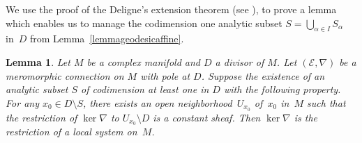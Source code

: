 \documentclass[10pt,a4paper]{amsart}
\numberwithin{equation}{section}
\newtheorem{Lemma}[Theorem]{Lemma}
\begin{document}
We use the proof of the Deligne's extension theorem (see \cite[Chapter~II, Theorems~5.2 and~5.4]{Deligne}), to prove a lemma which enables us to manage the codimension one analytic subset $S=\bigcup_{\alpha\in I} S_\alpha$ in~$D$ from Lemma~\ref{lemmageodesicaffine}.

\begin{Lemma}\label{lemmalocalmonodromy} Let $M$ be a complex manifold and $D$ a divisor of $M$. Let $(\mathcal{E},\nabla)$ be a meromorphic connection on $M$ with pole at $D$.
Suppose the existence of an analytic subset $S$ of codimension at least one in $D$ with the following property. For any $x_0\in D\setminus S$, there exists an open neighborhood~$U_{x_0}$ of~$x_0$ in~$M$ such that the restriction of $\ker  \nabla$ to $U_{x_0}\setminus D$ is a constant sheaf.
Then $\ker  \nabla$ is the restriction of a local system on~$M$.
\end{Lemma}
\end{document}
